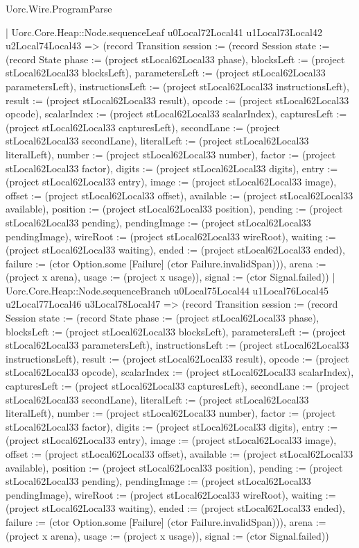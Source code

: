 \begin{lexlean}{Uorc.Wire.ProgramParse}
\begin{semanticmodule}
{        | Uorc.Core.Heap::Node.sequenceLeaf u0Local72Local41 u1Local73Local42 u2Local74Local43 => (record Transition {session := (record Session {state := (record State {phase := (project stLocal62Local33 phase), blocksLeft := (project stLocal62Local33 blocksLeft), parametersLeft := (project stLocal62Local33 parametersLeft), instructionsLeft := (project stLocal62Local33 instructionsLeft), result := (project stLocal62Local33 result), opcode := (project stLocal62Local33 opcode), scalarIndex := (project stLocal62Local33 scalarIndex), capturesLeft := (project stLocal62Local33 capturesLeft), secondLane := (project stLocal62Local33 secondLane), literalLeft := (project stLocal62Local33 literalLeft), number := (project stLocal62Local33 number), factor := (project stLocal62Local33 factor), digits := (project stLocal62Local33 digits), entry := (project stLocal62Local33 entry), image := (project stLocal62Local33 image), offset := (project stLocal62Local33 offset), available := (project stLocal62Local33 available), position := (project stLocal62Local33 position), pending := (project stLocal62Local33 pending), pendingImage := (project stLocal62Local33 pendingImage), wireRoot := (project stLocal62Local33 wireRoot), waiting := (project stLocal62Local33 waiting), ended := (project stLocal62Local33 ended), failure := (ctor Option.some [Failure] (ctor Failure.invalidSpan))}), arena := (project x arena), usage := (project x usage)}), signal := (ctor Signal.failed)})
        | Uorc.Core.Heap::Node.sequenceBranch u0Local75Local44 u1Local76Local45 u2Local77Local46 u3Local78Local47 => (record Transition {session := (record Session {state := (record State {phase := (project stLocal62Local33 phase), blocksLeft := (project stLocal62Local33 blocksLeft), parametersLeft := (project stLocal62Local33 parametersLeft), instructionsLeft := (project stLocal62Local33 instructionsLeft), result := (project stLocal62Local33 result), opcode := (project stLocal62Local33 opcode), scalarIndex := (project stLocal62Local33 scalarIndex), capturesLeft := (project stLocal62Local33 capturesLeft), secondLane := (project stLocal62Local33 secondLane), literalLeft := (project stLocal62Local33 literalLeft), number := (project stLocal62Local33 number), factor := (project stLocal62Local33 factor), digits := (project stLocal62Local33 digits), entry := (project stLocal62Local33 entry), image := (project stLocal62Local33 image), offset := (project stLocal62Local33 offset), available := (project stLocal62Local33 available), position := (project stLocal62Local33 position), pending := (project stLocal62Local33 pending), pendingImage := (project stLocal62Local33 pendingImage), wireRoot := (project stLocal62Local33 wireRoot), waiting := (project stLocal62Local33 waiting), ended := (project stLocal62Local33 ended), failure := (ctor Option.some [Failure] (ctor Failure.invalidSpan))}), arena := (project x arena), usage := (project x usage)}), signal := (ctor Signal.failed)})
}
\end{semanticmodule}
\end{lexlean}
